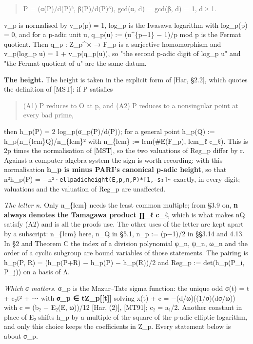 \documentclass[11pt,a4paper]{article}
\theoremstyle{named}
\begin{document}
\begin{quote}
P = (α(P)/d(P)², β(P)/d(P)³),  gcd(α, d) = gcd(β, d) = 1, d ≥ 1.
\end{quote}

v\_p is normalised by v\_p(p) = 1, log\_p is the Iwasawa logarithm with log\_p(p) = 0, and for a p-adic unit u, q\_p(u) := (u\textasciicircum{}\{p−1\} − 1)/p mod p is the Fermat quotient. Then q\_p : Z\_p\textasciicircum{}× → F\_p is a surjective homomorphism and v\_p(log\_p u) = 1 + v\_p(q\_p(u)), so "the second p-adic digit of log\_p u" and "the Fermat quotient of u" are the same datum.

\textbf{The height.} The height is taken in the explicit form of [Har, §2.2], which quotes the definition of [MST]: if P satisfies

\begin{quote}
(A1) P reduces to O at p, and (A2) P reduces to a nonsingular point at every bad prime,
\end{quote}

then h\_p(P) = 2 log\_p(σ\_p(P)/d(P)); for a general point h\_p(Q) := h\_p(n\_\{lcm\}Q)/n\_\{lcm\}² with n\_\{lcm\} := lcm(\#E(F\_p), lcm\_ℓ c\_ℓ). This is 2p times the normalisation of [MST], so the two valuations of Reg\_p differ by r. Against a computer algebra system the sign is worth recording: with this normalisation \textbf{h\_p is minus PARI's canonical p-adic height}, so that n²h\_p(P) = −n²·\texttt{ellpadicheight(E,p,n,P)*[1,−s₂]\textasciitilde{}} exactly, in every digit; valuations and the valuation of Reg\_p are unaffected.

\textit{The letter n.} Only n\_\{lcm\} needs the least common multiple; from §3.9 on, \textbf{n always denotes the Tamagawa product ∏\_ℓ c\_ℓ}, which is what makes nQ satisfy (A2) and is all the proofs use. The other uses of the letter are kept apart by a subscript: n\_\{lcm\} here, n\_Q in §5.1, n\_p := (p−1)/2 in §§3.14 and 4.13. In §2 and Theorem C the index of a division polynomial φ\_n, ψ\_n, ω\_n and the order of a cyclic subgroup are bound variables of those statements. The pairing is h\_p(P, R) = (h\_p(P+R) − h\_p(P) − h\_p(R))/2 and Reg\_p := det(h\_p(P\_i, P\_j)) on a basis of Λ.

\textit{Which σ matters.} σ\_p is the Mazur–Tate sigma function: the unique odd σ(t) = t + c₂t² + ⋯ with \textbf{σ\_p ∈ tZ\_p[[t]]} solving x(t) + c = −(d/ω)((1/σ)(dσ/ω)) with c = (b₂ − E₂(E, ω))/12 [Har, (2)], [MT91]; c₂ = a₁/2. Another constant in place of E₂ shifts h\_p by a multiple of the square of the p-adic elliptic logarithm, and only this choice keeps the coefficients in Z\_p. Every statement below is about σ\_p.
\end{document}
